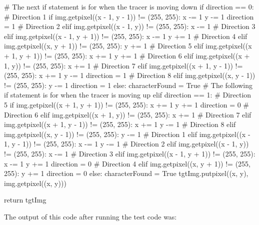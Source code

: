 \documentclass{report}
\begin{document}
\begin{python}
        #  The next if statement is for when the tracer is moving down
        if direction == 0:
            # Direction 1
            if img.getpixel((x - 1, y - 1)) != (255, 255):
                x -= 1
                y -= 1
                direction = 1
            # Direction 2
            elif img.getpixel((x - 1, y)) != (255, 255):
                x -= 1
            # Direction 3
            elif img.getpixel((x - 1, y + 1)) != (255, 255):
                x -= 1
                y += 1
            # Direction 4
            elif img.getpixel((x, y + 1)) != (255, 255):
                y += 1
            # Direction 5
            elif img.getpixel((x + 1, y + 1)) != (255, 255):
                x += 1
                y += 1
            # Direction 6
            elif img.getpixel((x + 1, y)) != (255, 255):
                x += 1
            # Direction 7
            elif img.getpixel((x + 1, y - 1)) != (255, 255):
                x += 1
                y -= 1
                direction = 1
            # Direction 8
            elif img.getpixel((x, y - 1)) != (255, 255):
                y -= 1
                direction = 1
            else:
                characterFound = True
        #  The following if statement is for when the tracer is moving up
        elif direction == 1:
            # Direction 5
            if img.getpixel((x + 1, y + 1)) != (255, 255):
                x += 1
                y += 1
                direction = 0
            # Direction 6
            elif img.getpixel((x + 1, y)) != (255, 255):
                x += 1
            # Direction 7
            elif img.getpixel((x + 1, y - 1)) != (255, 255):
                x += 1
                y -= 1
            # Direction 8
            elif img.getpixel((x, y - 1)) != (255, 255):
                y -= 1
            # Direction 1
            elif img.getpixel((x - 1, y - 1)) != (255, 255):
                x -= 1
                y -= 1
            # Direction 2
            elif img.getpixel((x - 1, y)) != (255, 255):
                x -= 1
            # Direction 3
            elif img.getpixel((x - 1, y + 1)) != (255, 255):
                x -= 1
                y += 1
                direction = 0
            # Direction 4
            elif img.getpixel((x, y + 1)) != (255, 255):
                y += 1
                direction = 0
            else:
                characterFound = True
    tgtImg.putpixel((x, y), img.getpixel((x, y)))

    return tgtImg
\end{python}
The output of this code after running the test code was:
\end{document}
